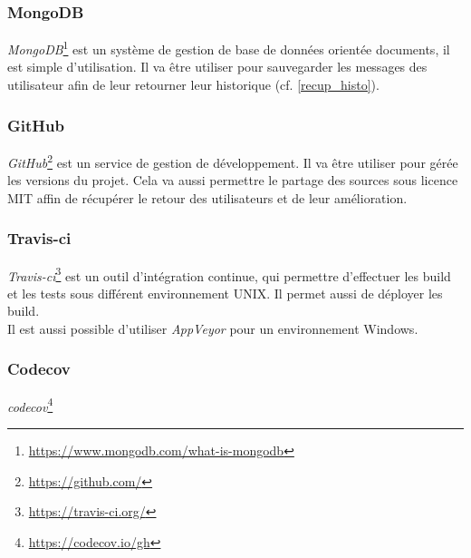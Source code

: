 \documentclass[12pt]{article}
\begin{document}
\subsubsection{MongoDB}
\textit{MongoDB}\footnote{\url{https://www.mongodb.com/what-is-mongodb}} est un système de gestion de base de données orientée documents, il est simple d'utilisation. Il va être utiliser pour sauvegarder les messages des utilisateur afin de leur retourner leur historique (cf. \ref{recup_histo}).

\subsubsection{GitHub}
\textit{GitHub}\footnote{\url{https://github.com/}} est un service de gestion de développement. Il va être utiliser pour gérée les versions du projet. Cela va aussi permettre le partage des sources sous licence MIT affin de récupérer le retour des utilisateurs et de leur amélioration.

\subsubsection{Travis-ci}
\textit{Travis-ci}\footnote{\url{https://travis-ci.org/}} est un outil d'intégration continue, qui permettre d'effectuer les build et les tests sous différent environnement UNIX. Il permet aussi de déployer les build.\\
Il est aussi possible d'utiliser \textit{AppVeyor} pour un environnement Windows.

\subsubsection{Codecov}
\textit{codecov}\footnote{\url{https://codecov.io/gh}}




\end{document}

